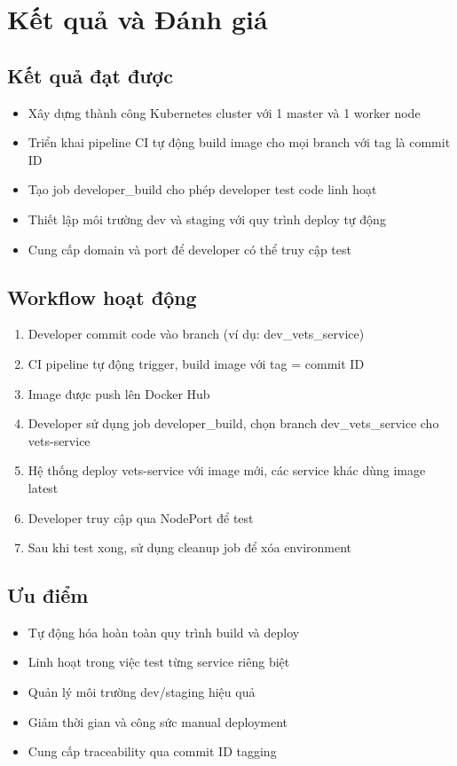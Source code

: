 \documentclass[12pt,a4paper]{article}
\begin{document}
\section{Kết quả và Đánh giá}

\subsection{Kết quả đạt được}
\begin{itemize}
    \item Xây dựng thành công Kubernetes cluster với 1 master và 1 worker node
    \item Triển khai pipeline CI tự động build image cho mọi branch với tag là commit ID
    \item Tạo job developer\_build cho phép developer test code linh hoạt
    \item Thiết lập môi trường dev và staging với quy trình deploy tự động
    \item Cung cấp domain và port để developer có thể truy cập test
\end{itemize}

\subsection{Workflow hoạt động}
\begin{enumerate}
    \item Developer commit code vào branch (ví dụ: dev\_vets\_service)
    \item CI pipeline tự động trigger, build image với tag = commit ID
    \item Image được push lên Docker Hub
    \item Developer sử dụng job developer\_build, chọn branch dev\_vets\_service cho vets-service
    \item Hệ thống deploy vets-service với image mới, các service khác dùng image latest
    \item Developer truy cập qua NodePort để test
    \item Sau khi test xong, sử dụng cleanup job để xóa environment
\end{enumerate}

\subsection{Ưu điểm}
\begin{itemize}
    \item Tự động hóa hoàn toàn quy trình build và deploy
    \item Linh hoạt trong việc test từng service riêng biệt
    \item Quản lý môi trường dev/staging hiệu quả
    \item Giảm thời gian và công sức manual deployment
    \item Cung cấp traceability qua commit ID tagging
\end{itemize}
\end{document}
